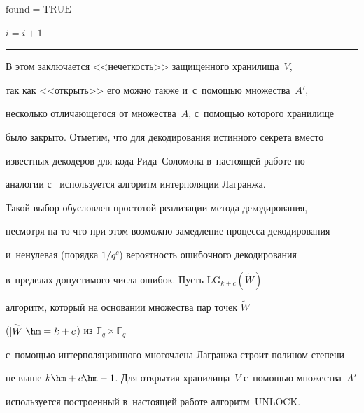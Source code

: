 \begin{algorithm}[b]
{{{$\mathrm{found}=\mathrm{TRUE}$}


$i=i+1$


}


}






\hrule


\end{algorithm}








В этом заключается <<нечеткость>> защищенного хранилища~$V$, 


так как <<открыть>> его можно также и~с~по\-мощью множества~$A'$, 


несколько отличающегося от множества~$A$, с~помощью которого хранилище 


было закрыто. Отметим, что для декодирования истинного секрета вместо 


известных декодеров для кода Ри\-да--Со\-ло\-мо\-на в~настоящей работе по 


аналогии с~\cite{Ulu2005} используется алгоритм интерполяции Лагранжа. 


Такой выбор обусловлен простотой реализации метода декодирования, 


несмотря на то что при этом возможно замедление процесса декодирования 


и~ненулевая (порядка $1/q^{c}$) вероятность ошибочного декодирования 


в~пределах допустимого числа ошибок. Пусть $\textrm{LG}_{k+c}(\widetilde{W})$~--- 


алгоритм, который на основании множества пар точек $\widetilde{W}$ 


($|\widetilde{W}|\hm=k+c$) из $\mathbb{F}_q\times\mathbb{F}_q$ 


с~помощью интерполяционного многочлена Лагранжа строит полином степени 


не выше $k\hm+c\hm-1$. Для открытия хранилища~$V$ с~по\-мощью множества~$A'$ 


используется построенный в~настоящей работе алгоритм~$\mathrm{UNLOCK}$. 


